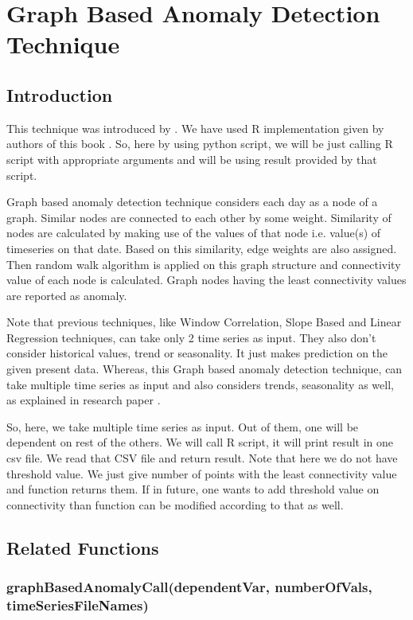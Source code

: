 \chapter{Graph Based Anomaly Detection Technique}

\section{Introduction}

This technique was introduced by \cite{nasa}. We have used R implementation given by 
authors of this book \cite{nasarbook}. So, here by using python script, we will be just 
calling R script with appropriate arguments and will be using result provided 
by that script.

Graph based anomaly detection technique considers each day as a  node of a 
graph. Similar nodes are connected to each other by some weight. Similarity of 
nodes are calculated by making use of the values of that node i.e. value(s) of 
timeseries on that date. Based on this similarity, edge weights are also 
assigned. Then random walk algorithm is applied on this graph structure and 
connectivity value of each node is calculated. Graph nodes having the least 
connectivity values are reported as anomaly.

Note that previous techniques, like Window 
Correlation, Slope Based and Linear Regression techniques, can take only 2 time 
series as input. They also don't consider historical values, trend or 
seasonality. It just makes prediction on the given present data. Whereas, this 
Graph based anomaly detection technique, can take multiple time series as input 
and also considers trends, seasonality as well, as explained in research paper 
\cite{nasa}.

So, here, we take multiple time series as input. Out of them, one will be 
dependent on rest of the others. We will call R script, it will print result in 
one csv file. We read that CSV file and return result. Note that here we do not 
have threshold value. We just give number of points with the least connectivity 
value and function returns them. If in future, one wants to add threshold value 
on connectivity than function can be modified according to that as well.

\section{Related Functions}

\subsection{graphBasedAnomalyCall(dependentVar, numberOfVals, 
timeSeriesFileNames)}

